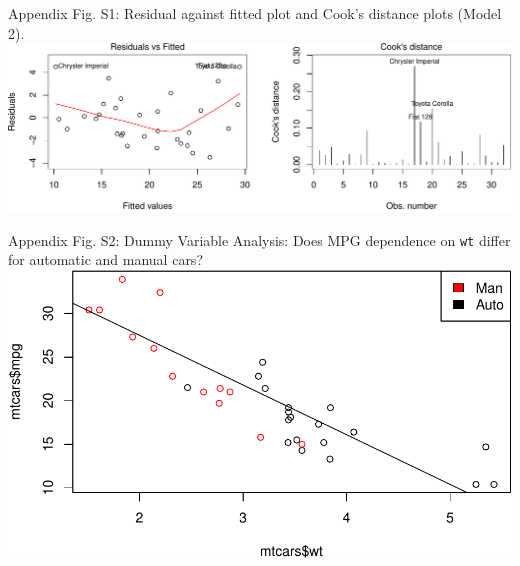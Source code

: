 \documentclass[]{article}
\begin{document}
Appendix Fig. S1: Residual against fitted plot and Cook's distance plots
(Model
2).\\\includegraphics{./article_files/figure-latex/unnamed-chunk-6.pdf}

Appendix Fig. S2: Dummy Variable Analysis: Does MPG dependence on
\texttt{wt} differ for automatic and manual
cars?\\\includegraphics{./article_files/figure-latex/unnamed-chunk-7.pdf}
\end{document}

